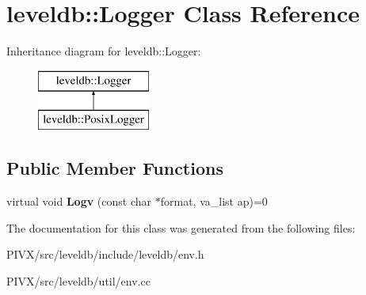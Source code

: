 \hypertarget{classleveldb_1_1_logger}{}\section{leveldb\+:\+:Logger Class Reference}
\label{classleveldb_1_1_logger}
Inheritance diagram for leveldb\+:\+:Logger\+:\begin{figure}[H]
\begin{center}
\leavevmode
\includegraphics[height=2.000000cm]{classleveldb_1_1_logger}
\end{center}
\end{figure}
\subsection*{Public Member Functions}
\begin{DoxyCompactItemize}
\item 
\mbox{\label{classleveldb_1_1_logger_a408e238a0028a45e9cc7aec6ad2277c5}} 
virtual void {\bfseries Logv} (const char $\ast$format, va\+\_\+list ap)=0
\end{DoxyCompactItemize}


The documentation for this class was generated from the following files\+:\begin{DoxyCompactItemize}
\item 
P\+I\+V\+X/src/leveldb/include/leveldb/env.\+h\item 
P\+I\+V\+X/src/leveldb/util/env.\+cc\end{DoxyCompactItemize}
